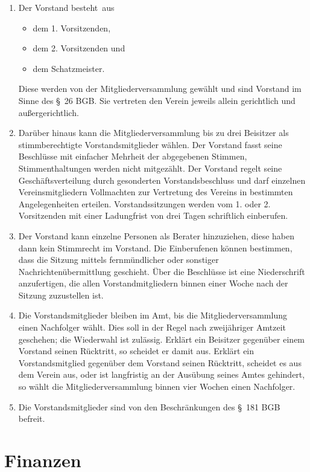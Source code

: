 \documentclass[a4paper, 10pt, headings=normal]{scrartcl}
\begin{document}
\begin{multicols}{2}
\begin{enumerate}[label={(\arabic*)}]
	\item
		Der Vorstand besteht aus
		\begin{itemize}[label={–}]
			\item
				dem 1. Vorsitzenden,
			\item
				dem 2. Vorsitzenden und
			\item
				dem Schatzmeister.
		\end{itemize}
		Diese werden von der Mitgliederversammlung gewählt und sind Vorstand im Sinne des §~26 BGB.
		Sie vertreten den Verein jeweils allein gerichtlich und außergerichtlich.
	\item
		Darüber hinaus kann die Mitgliederversammlung bis zu drei Beisitzer als stimmberechtigte Vorstandsmitglieder wählen.
		Der Vorstand fasst seine Beschlüsse mit einfacher Mehrheit der abgegebenen Stimmen, Stimmenthaltungen werden nicht mitgezählt.
		Der Vorstand regelt seine Geschäftsverteilung durch gesonderten Vorstandsbeschluss und darf einzelnen Vereinsmitgliedern Vollmachten zur Vertretung des Vereins in bestimmten Angelegenheiten erteilen.
		Vorstandssitzungen werden vom 1. oder 2. Vorsitzenden mit einer Ladungfrist von drei Tagen schriftlich einberufen.
	\item
		Der Vorstand kann einzelne Personen als Berater hinzuziehen, diese haben dann kein Stimmrecht im Vorstand.
		Die Einberufenen können bestimmen, dass die Sitzung mittels fernmündlicher oder sonstiger Nachrichtenübermittlung geschieht.
		Über die Beschlüsse ist eine Niederschrift anzufertigen, die allen Vorstandmitgliedern binnen einer Woche nach der Sitzung zuzustellen ist.
	\item
		Die Vorstandsmitglieder bleiben im Amt, bis die Mitgliederversammlung einen Nachfolger wählt.
		Dies soll in der Regel nach zweijähriger Amtzeit geschehen; die Wiederwahl ist zulässig.
		Erklärt ein Beisitzer gegenüber einem Vorstand seinen Rücktritt, so scheidet er damit aus.
		Erklärt ein Vorstandsmitglied gegenüber dem Vorstand seinen Rücktritt, scheidet es aus dem Verein aus, oder ist langfristig an der Ausübung seines Amtes gehindert, so wählt die Mitgliederversammlung binnen vier Wochen einen Nachfolger.
	\item
		Die Vorstandsmitglieder sind von den Beschränkungen des §~181 BGB befreit.
\end{enumerate}

\section{Finanzen}
\label{par:finanzen}


\end{multicols}
\end{document}
